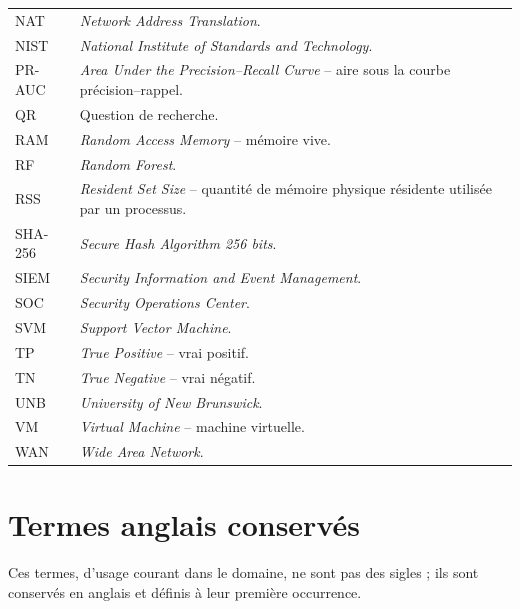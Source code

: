 \begin{longtable}{p{3.2cm}p{11.2cm}}
NAT &
\textit{Network Address Translation}. \\

NIST &
\textit{National Institute of Standards and Technology}. \\

PR-AUC &
\textit{Area Under the Precision--Recall Curve} -- aire sous la courbe
précision--rappel. \\

QR &
Question de recherche. \\

RAM &
\textit{Random Access Memory} -- mémoire vive. \\

RF &
\textit{Random Forest}. \\

RSS &
\textit{Resident Set Size} -- quantité de mémoire physique résidente
utilisée par un processus. \\

SHA-256 &
\textit{Secure Hash Algorithm 256 bits}. \\

SIEM &
\textit{Security Information and Event Management}. \\

SOC &
\textit{Security Operations Center}. \\

SVM &
\textit{Support Vector Machine}. \\

TP &
\textit{True Positive} -- vrai positif. \\

TN &
\textit{True Negative} -- vrai négatif. \\

UNB &
\textit{University of New Brunswick}. \\

VM &
\textit{Virtual Machine} -- machine virtuelle. \\

WAN &
\textit{Wide Area Network}. \\

\bottomrule

\end{longtable}

\section*{Termes anglais conservés}

Ces termes, d'usage courant dans le domaine, ne sont pas des sigles ; ils sont conservés en anglais et définis à leur première occurrence.

